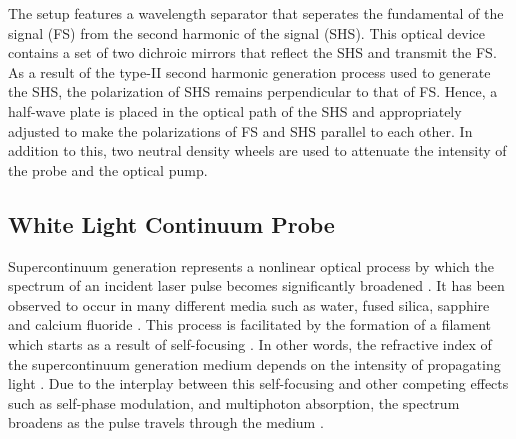 The setup features a wavelength separator that seperates the fundamental of the signal (FS) from the second harmonic of the signal (SHS). This optical device contains a set of two dichroic mirrors that reflect the SHS and transmit the FS. As a result of the type-II second harmonic generation process used to generate the SHS, the polarization of SHS remains perpendicular to that of FS. Hence, a half-wave plate is placed in the optical path of the SHS and appropriately adjusted to make the polarizations of FS and SHS parallel to each other. In addition to this, two neutral density wheels are used to attenuate the intensity of the probe and the optical pump.

\subsection{White Light Continuum Probe}

\label{section:white_light_probe}
Supercontinuum generation represents a nonlinear optical process by which the spectrum of an incident laser pulse becomes significantly broadened \cite{dubietis2017ultrafast}. It has been observed to occur in many different media such as water, fused silica, sapphire and calcium fluoride \cite{dubietis2017ultrafast}. This process is facilitated by the formation of a filament which starts as a result of self-focusing \cite{dubietis2017ultrafast}. In other words, the refractive index of the supercontinuum generation medium depends on the intensity of propagating light \cite{dubietis2017ultrafast}. Due to the interplay between this self-focusing and other competing effects such as self-phase modulation, and multiphoton absorption, the spectrum  broadens as the pulse travels through the medium \cite{dubietis2017ultrafast}. 

